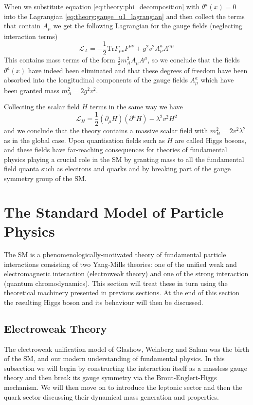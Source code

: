 When we substitute equation \ref{eq:theory:phi_decomposition} with $\theta^{a}(x)=0$ into the Lagrangian \ref{eq:theory:gauge_u1_lagrangian} and then collect the terms that contain $A_{\mu}$ we get the following Lagrangian for the gauge fields (neglecting interaction terms)
\begin{equation}
    \label{eq:theory:abelian_gaugefield_L}
    \mathcal{L}_{A} = -\frac{1}{2}\mathrm{Tr}F_{\mu\nu}F^{\mu\nu} + g^{2}v^{2}A^{a}_{\mu}A^{a\mu}
\end{equation}
This contains mass terms of the form $\frac{1}{2}m_{A}^{2}A_{\mu}A^{\mu}$, so we conclude that the fields $\theta^{a}(x)$ have indeed been eliminated and that these degrees of freedom have been absorbed into the longitudinal components of the gauge fields $A^{a}_{\mu}$ which have been granted mass $m_{A}^{2}=2g^{2}v^{2}$. 


Collecting the scalar field $H$ terms in the same way we have 
\begin{equation}
    \label{eq:theory:abelian_scalar_SSB_L}
    \mathcal{L}_{H} = \frac{1}{2}(\partial_{\mu}H)(\partial^{\mu}H) - \lambda^{2}v^{2}H^{2}%
\end{equation}
and we conclude that the theory contains a massive scalar field with $m_{H}^{2} = 2v^{2}\lambda^{2}$ as in the global case. Upon quantisation fields such as $H$ are called Higgs bosons, and these fields have far-reaching consequences for theories of fundamental physics playing a crucial role in the SM by granting mass to all the fundamental field quanta such as electrons and quarks and by breaking part of the gauge symmetry group of the SM. 


\section{The Standard Model of Particle Physics}
The SM is a phenomenologically-motivated theory of fundamental particle interactions consisting of two Yang-Mills theories: one of the unified weak and electromagnetic interaction (electroweak theory) and one of the strong interaction (quantum chromodynamics). This section will treat these in turn using the theoretical machinery presented in previous sections. At the end of this section the resulting Higgs boson and its behaviour will then be discussed. 
\subsection{Electroweak Theory}
The electroweak unification model of Glashow, Weinberg and Salam was the birth of the SM, and our modern understanding of fundamental physics. In this subsection we will begin by constructing the interaction itself as a massless gauge theory and then break its gauge symmetry via the Brout-Englert-Higgs mechanism. We will then move on to introduce the leptonic sector and then the quark sector discussing their dynamical mass generation and properties. 

